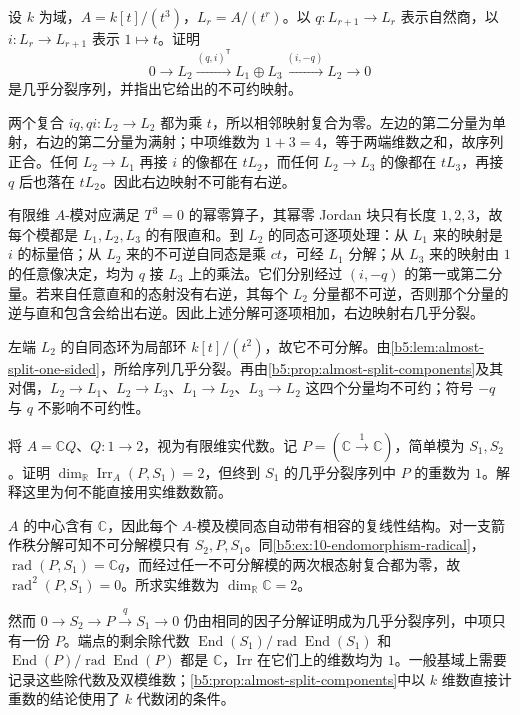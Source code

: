 \begin{optionalexercise}\label{b5:ex:10-length-three-almost-split}
	设 \(k\) 为域，\(A=k[t]/(t^3)\)，\(L_r=A/(t^r)\)。以 \(q:L_{r+1}\to L_r\) 表示自然商，以 \(i:L_r\to L_{r+1}\) 表示 \(1\mapsto t\)。证明
	\[
		0\longrightarrow L_2\xrightarrow{(q,i)^{\mathsf T}}L_1\oplus L_3
		\xrightarrow{(i,-q)}L_2\longrightarrow0
	\]
	是几乎分裂序列，并指出它给出的不可约映射。
\end{optionalexercise}
\begin{solution}
	两个复合 \(iq,qi:L_2\to L_2\) 都为乘 \(t\)，所以相邻映射复合为零。左边的第二分量为单射，右边的第二分量为满射；中项维数为 \(1+3=4\)，等于两端维数之和，故序列正合。任何 \(L_2\to L_1\) 再接 \(i\) 的像都在 \(tL_2\)，而任何 \(L_2\to L_3\) 的像都在 \(tL_3\)，再接 \(q\) 后也落在 \(tL_2\)。因此右边映射不可能有右逆。

	有限维 \(A\)-模对应满足 \(T^3=0\) 的幂零算子，其幂零 Jordan 块只有长度 \(1,2,3\)，故每个模都是 \(L_1,L_2,L_3\) 的有限直和。到 \(L_2\) 的同态可逐项处理：从 \(L_1\) 来的映射是 \(i\) 的标量倍；从 \(L_2\) 来的不可逆自同态是乘 \(ct\)，可经 \(L_1\) 分解；从 \(L_3\) 来的映射由 \(1\) 的任意像决定，均为 \(q\) 接 \(L_3\) 上的乘法。它们分别经过 \((i,-q)\) 的第一或第二分量。若来自任意直和的态射没有右逆，其每个 \(L_2\) 分量都不可逆，否则那个分量的逆与直和包含会给出右逆。因此上述分解可逐项相加，右边映射右几乎分裂。

	左端 \(L_2\) 的自同态环为局部环 \(k[t]/(t^2)\)，故它不可分解。由\cref{b5:lem:almost-split-one-sided}，所给序列几乎分裂。再由\cref{b5:prop:almost-split-components}及其对偶，\(L_2\to L_1\)、\(L_2\to L_3\)、\(L_1\to L_2\)、\(L_3\to L_2\) 这四个分量均不可约；符号 \(-q\) 与 \(q\) 不影响不可约性。
\end{solution}

\begin{optionalexercise}\label{b5:ex:10-division-ring-arrow-count}
	将 \(A=\mathbb C Q\)、\(Q:1\to2\)，视为有限维实代数。记 \(P=(\mathbb C\xrightarrow{1}\mathbb C)\)，简单模为 \(S_1,S_2\)。证明 \(\dim_{\mathbb R}\operatorname{Irr}_A(P,S_1)=2\)，但终到 \(S_1\) 的几乎分裂序列中 \(P\) 的重数为 \(1\)。解释这里为何不能直接用实维数数箭。
\end{optionalexercise}
\begin{solution}
	\(A\) 的中心含有 \(\mathbb C\)，因此每个 \(A\)-模及模同态自动带有相容的复线性结构。对一支箭作秩分解可知不可分解模只有 \(S_2,P,S_1\)。同\cref{b5:ex:10-endomorphism-radical}，\(\operatorname{rad}(P,S_1)=\mathbb C q\)，而经过任一不可分解模的两次根态射复合都为零，故 \(\operatorname{rad}^2(P,S_1)=0\)。所求实维数为 \(\dim_{\mathbb R}\mathbb C=2\)。

	然而 \(0\to S_2\to P\xrightarrow{q}S_1\to0\) 仍由相同的因子分解证明成为几乎分裂序列，中项只有一份 \(P\)。端点的剩余除代数 \(\operatorname{End}(S_1)/\operatorname{rad}\operatorname{End}(S_1)\) 和 \(\operatorname{End}(P)/\operatorname{rad}\operatorname{End}(P)\) 都是 \(\mathbb C\)，Irr 在它们上的维数均为 \(1\)。一般基域上需要记录这些除代数及双模维数；\cref{b5:prop:almost-split-components}中以 \(k\) 维数直接计重数的结论使用了 \(k\) 代数闭的条件。
\end{solution}

